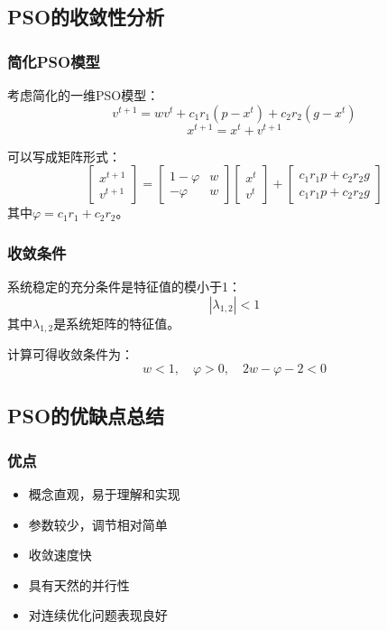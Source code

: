\subsection{PSO的收敛性分析}

\subsubsection{简化PSO模型}

考虑简化的一维PSO模型：
\[
v^{t+1} = w v^t + c_1 r_1 (p - x^t) + c_2 r_2 (g - x^t)
\]
\[
x^{t+1} = x^t + v^{t+1}
\]

可以写成矩阵形式：
\[
\begin{bmatrix}
x^{t+1} \\ v^{t+1}
\end{bmatrix}
=
\begin{bmatrix}
1 - \varphi & w \\
-\varphi & w
\end{bmatrix}
\begin{bmatrix}
x^t \\ v^t
\end{bmatrix}
+
\begin{bmatrix}
c_1 r_1 p + c_2 r_2 g \\
c_1 r_1 p + c_2 r_2 g
\end{bmatrix}
\]
其中$\varphi = c_1 r_1 + c_2 r_2$。

\subsubsection{收敛条件}

系统稳定的充分条件是特征值的模小于1：
\[
|\lambda_{1,2}| < 1
\]
其中$\lambda_{1,2}$是系统矩阵的特征值。

计算可得收敛条件为：
\[
w < 1, \quad \varphi > 0, \quad 2w - \varphi - 2 < 0
\]

\subsection{PSO的优缺点总结}

\subsubsection{优点}
\begin{itemize}
    \item 概念直观，易于理解和实现
    \item 参数较少，调节相对简单
    \item 收敛速度快
    \item 具有天然的并行性
    \item 对连续优化问题表现良好
\end{itemize}

